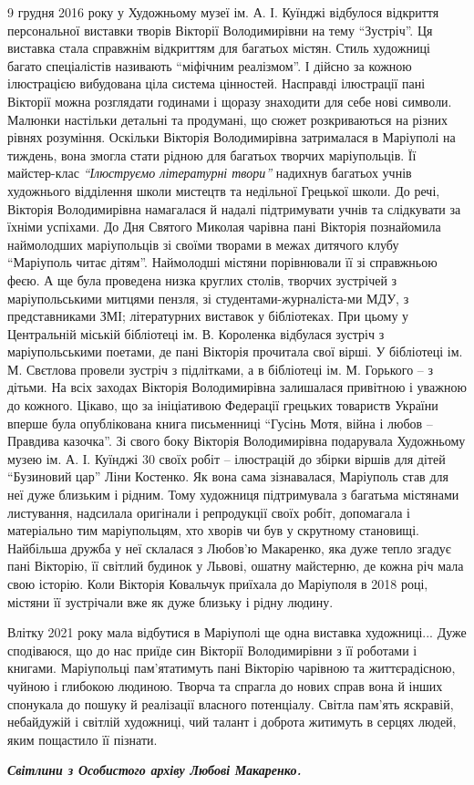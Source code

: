 9 грудня 2016 року у Художньому музеї ім. А. І. Куїнджі відбулося відкриття
персональної виставки творів Вікторії Володимирівни на тему \enquote{Зустріч}. Ця
виставка стала справжнім відкриттям для багатьох містян. Стиль художниці багато
спеціалістів називають \enquote{міфічним реалізмом}. І дійсно за кожною ілюстрацією
вибудована ціла система цінностей. Насправді ілюстрації пані Вікторії можна
розглядати годинами і щоразу знаходити для себе нові символи. Малюнки настільки
детальні та  продумані, що сюжет розкриваються на різних рівнях розуміння.
Оскільки Вікторія Володимирівна затрималася в Маріуполі на тиждень, вона змогла
стати рідною для багатьох творчих маріупольців. Її майстер-клас \emph{\enquote{Ілюструємо
літературні твори}} надихнув багатьох учнів художнього відділення школи мистецтв
та недільної Грецької школи. До речі, Вікторія Володимирівна намагалася й
надалі підтримувати учнів та слідкувати за їхніми успіхами. До Дня Святого
Миколая чарівна пані Вікторія познайомила наймолодших маріупольців зі своїми
творами в межах дитячого клубу \enquote{Маріуполь читає дітям}. Наймолодші містяни
порівнювали її зі справжньою феєю. А ще була проведена низка круглих столів,
творчих зустрічей з маріупольськими митцями пензля, зі студентами-журналіста\hyp{}ми
МДУ, з представниками ЗМІ; літературних виставок у бібліотеках. При цьому у
Центральній міській бібліотеці ім. В. Короленка відбулася зустріч з
маріупольськими поетами, де пані Вікторія прочитала свої вірші. У бібліотеці
ім. М. Свєтлова провели зустріч з підлітками, а в бібліотеці ім. М. Горького –
з дітьми. На всіх заходах Вікторія Володимирівна залишалася привітною і уважною
до кожного. Цікаво, що за ініціативою Федерації грецьких товариств України
вперше була опублікована книга письменниці \enquote{Гусінь Мотя, війна і любов –
Правдива казочка}. Зі свого боку Вікторія Володимирівна подарувала Художньому
музею ім. А. І. Куїнджі 30 своїх робіт – ілюстрацій до збірки віршів для дітей
\enquote{Бузиновий цар} Ліни Костенко. Як вона сама зізнавалася, Маріуполь став для неї
дуже близьким і рідним. Тому художниця підтримувала з багатьма містянами
листування, надсилала оригінали і репродукції своїх робіт, допомагала і
матеріально тим маріупольцям, хто хворів чи був у скрутному становищі.
Найбільша дружба у неї склалася з Любов'ю Макаренко, яка дуже тепло згадує пані
Вікторію, її світлий будинок у Львові, ошатну майстерню, де кожна річ мала свою
історію. Коли Вікторія Ковальчук приїхала до Маріуполя в 2018 році, містяни її
зустрічали вже як дуже близьку і рідну людину.


Влітку 2021 року мала відбутися в Маріуполі ще одна виставка художниці... Дуже
сподіваюся, що до нас приїде син Вікторії Володимирівни з її роботами  і
книгами. Маріупольці пам'ятатимуть пані Вікторію чарівною та життєрадісною,
чуйною і глибокою людиною. Творча та спрагла до нових справ вона й інших
спонукала до пошуку й реалізації власного потенціалу. Світла пам'ять яскравій,
небайдужій і світлій художниці, чий талант і доброта  житимуть в серцях людей,
яким пощастило її пізнати.

\textbf{\emph{Світлини з Особистого архіву Любові Макаренко.}}
